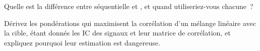 \begin{interviewq}\label{iq:rs:signal-combination:5}
Quelle est la différence entre  séquentielle et , et quand utiliseriez-vous chacune~?
\end{interviewq}

\begin{interviewq}\label{iq:rs:signal-combination:6}
Dérivez les pondérations qui maximisent la corrélation d'un mélange linéaire avec la cible, étant donnés les IC des signaux et leur matrice de corrélation, et expliquez
pourquoi leur estimation est dangereuse.
\end{interviewq}
